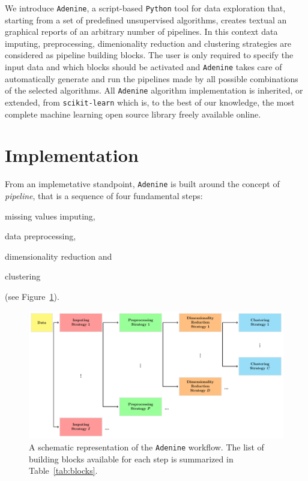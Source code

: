 \documentclass[twoside,11pt]{article}
\makeatletter
\newcommand{\ade}{\texttt{Adenine}\@\xspace}
\newcommand{\py}{\texttt{Python}\@\xspace}
\makeatother
\begin{document}
We introduce \ade, a script-based \py tool for data exploration that, starting from a set of predefined unsupervised algorithms, creates textual an graphical reports of an arbitrary number of pipelines. In this context data imputing, preprocessing, dimenionality reduction and clustering strategies are considered as pipeline building blocks. The user is only required to specify the input data and which blocks should be activated and \ade takes care of automatically generate and run the pipelines made by all possible combinations of the selected algorithms. All \ade algorithm implementation is inherited, or extended, from \texttt{scikit-learn} \citep{scikit-learn} which is, to the best of our knowledge, the most complete machine learning open source library freely available online.

\section{Implementation}\label{sec:implem}
From an implemetative standpoint, \ade is built around the concept of \emph{pipeline}, that is a sequence of four fundamental steps:
\begin{enumerate*}[label=(\roman*)]
  \item missing values imputing,
  \item data preprocessing,
  \item dimensionality reduction and
  \item clustering
\end{enumerate*} (see Figure~\ref{fig:workflow}).

\begin{figure}[h!]
    \centering
    \includegraphics[width=\textwidth]{ade_wf/ade_wf.pdf}
    \caption{A schematic representation of the \ade workflow. The list of building blocks available for each step is summarized in Table~\ref{tab:blocks}.}\label{fig:workflow}
\end{figure}
\end{document}
